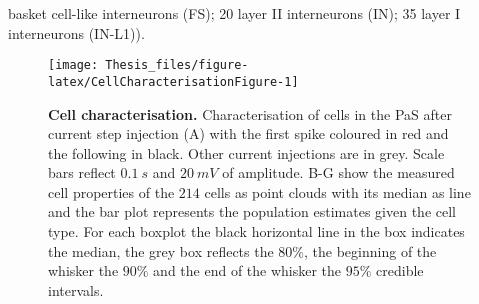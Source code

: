 \documentclass[
  12pt,
  a4paper,
  openany]{book}
\begin{document}
basket cell-like interneurons (FS); 20 layer II interneurons (IN); 35 layer I interneurons (IN-L1)).




\begin{figure}[htbp]

{\centering \texttt{[image: Thesis\_files/figure-latex/CellCharacterisationFigure-1]} 

}

\caption[Cell characterisation]{\textbf{Cell characterisation.} Characterisation of cells in the PaS after current step injection (A) with the first spike coloured in red and the following in black. Other current injections are in grey. Scale bars reflect \(0.1\ s\) and \(20\ mV\) of amplitude. B-G show the measured cell properties of the \(214\) cells as point clouds with its median as line and the bar plot represents the population estimates given the cell type. For each boxplot the black horizontal line in the box indicates the median, the grey box reflects the \(80\%\), the beginning of the whisker the \(90\%\) and the end of the whisker the \(95\%\) credible intervals.}\label{fig:CellCharacterisationFigure}
\end{figure}
\end{document}
